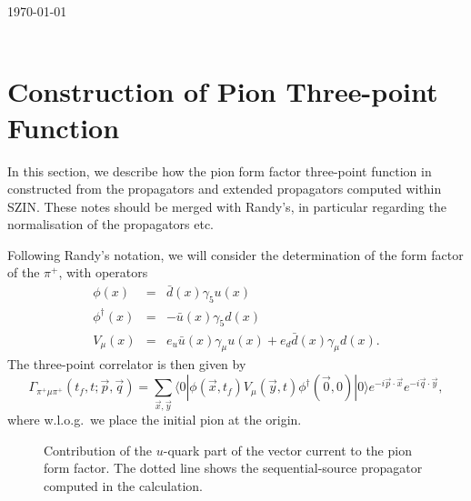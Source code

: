 \documentclass[12pt]{article}
\newcommand{\pdotx}{\vec{p} \cdot \vec{x}}
\begin{document}
\hfill \today\\[1.0ex]
\\[1.0ex]

\section{Construction of Pion Three-point Function}
In this section, we describe how the pion form factor three-point
function in constructed from the propagators and extended propagators
computed within SZIN.  These notes should be merged with Randy's, in
particular regarding the normalisation of the propagators etc.

Following Randy's notation, we will consider the determination of the
form factor of the $\pi^+$, with operators
\begin{eqnarray}
\phi(x) & = & \bar{d}(x) \gamma_5 u(x)\\
\phi^{\dagger}(x) & = & - \bar{u}(x) \gamma_5 d(x)\\
V_{\mu}(x) & = & e_u \bar{u}(x) \gamma_{\mu} u(x) + e_d \bar{d}(x)
\gamma_{\mu} d(x).
\end{eqnarray}
The three-point correlator is then given by
\begin{equation}
\Gamma_{\pi^+ \mu \pi^+}(t_f, t; \vec{p}, \vec{q}) = \sum_{\vec{x},
\vec{y}} \langle 0 | \phi(\vec{x}, t_f) V_{\mu}(\vec{y}, t)
\phi^{\dagger}(\vec{0},0) | 0 \rangle e^{-i\pdotx}
e^{-i\vec{q}\cdot\vec{y}},
\end{equation}
where w.l.o.g.\ we place the initial pion at the origin.
\begin{figure}[h]
\begin{center}
\caption{Contribution of the $u$-quark part of the vector current to
  the pion form factor.  The dotted line shows the sequential-source
  propagator computed in the calculation.}
\end{center}
\end{figure}
\end{document}
